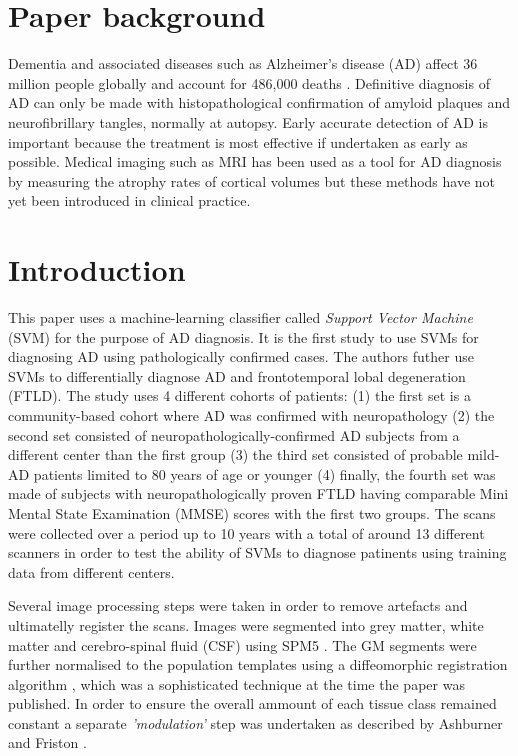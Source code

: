 \documentclass[11pt,a4paper,oneside]{report}
\begin{document}
\section*{Paper background}

Dementia and associated diseases such as Alzheimer's disease (AD) affect 36 million people globally \cite{world2012dementia} and account for 486,000 deaths \cite{lozano2013global}. Definitive diagnosis of AD can only be made with histopathological confirmation of amyloid plaques and neurofibrillary tangles, normally at autopsy. Early accurate detection of AD is important because the treatment is most effective if undertaken as early as possible. Medical imaging such as MRI has been used as a tool for AD diagnosis by measuring the atrophy rates of cortical volumes \cite{fox2004imaging,barnes2004differentiating} but these methods have not yet been introduced in clinical practice.

\section*{Introduction}


This paper uses a machine-learning classifier called \emph{Support Vector Machine} (SVM) for the purpose of AD diagnosis. It is the first study to use SVMs for diagnosing AD using pathologically confirmed cases. The authors futher use SVMs to differentially diagnose AD and frontotemporal lobal degeneration (FTLD). The study uses 4 different cohorts of patients: (1) the first set is a community-based cohort where AD was confirmed with neuropathology (2) the second set consisted of neuropathologically-confirmed AD subjects from a different center than the first group (3) the third set consisted of probable mild-AD patients limited to 80 years of age or younger (4) finally, the fourth set was made of subjects with neuropathologically proven FTLD having comparable Mini Mental State Examination (MMSE) scores with the first two groups. The scans were collected over a period up to 10 years with a total of around 13 different scanners in order to test the ability of SVMs to diagnose patinents using training data from different centers.


Several image processing steps were taken in order to remove artefacts and ultimatelly register the scans. Images were segmented into grey matter, white matter and cerebro-spinal fluid (CSF) using SPM5 \cite{SPM5}. The GM segments were further normalised to the population templates using a diffeomorphic registration algorithm \cite{ashburner2007fast}, which was a sophisticated technique at the time the paper was published. In order to ensure the overall ammount of each tissue class remained constant a separate \emph{'modulation'} step was undertaken as described by Ashburner and Friston \cite{ashburner2000voxel}.
\end{document}
